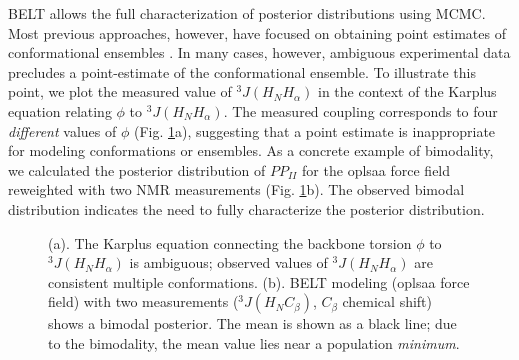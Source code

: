 \documentclass[11pt,titlepage]{article}
\begin{document}
BELT allows the full characterization of posterior distributions using MCMC.  Most previous approaches, however, have focused on obtaining point estimates of conformational ensembles \citep{rozycki2011saxs,  Graf2007}.  In many cases, however, ambiguous experimental data precludes a point-estimate of the conformational ensemble.  To illustrate this point, we plot the measured \citep{Graf2007} value of $^3J(H_NH_\alpha)$ in the context of the Karplus equation relating $\phi$ to $^3J(H_NH_\alpha)$.  The measured coupling corresponds to four \emph{different} values of $\phi$ (Fig. \ref{figure:Ambiguity}a), suggesting that a point estimate is inappropriate for modeling conformations or ensembles.  As a concrete example of bimodality, we calculated the posterior distribution of $PP_{II}$ for the oplsaa force field reweighted with two NMR measurements (Fig. \ref{figure:Ambiguity}b).  The observed bimodal distribution indicates the need to fully characterize the posterior 
distribution.  

\begin{figure}
\caption{
(a).  The Karplus equation connecting the backbone torsion $\phi$ to $^3J(H_NH_\alpha)$ is ambiguous; observed values of $^3J(H_NH_\alpha)$ are consistent multiple conformations.  (b).  BELT modeling (oplsaa force field) with two measurements ($^3J(H_N C_\beta)$, $C_\beta$ chemical shift) shows a bimodal posterior.  The mean is shown as a black line; due to the bimodality, the mean value lies near a population \emph{minimum}.
}
\label{figure:Ambiguity}

\end{figure}
\end{document}
